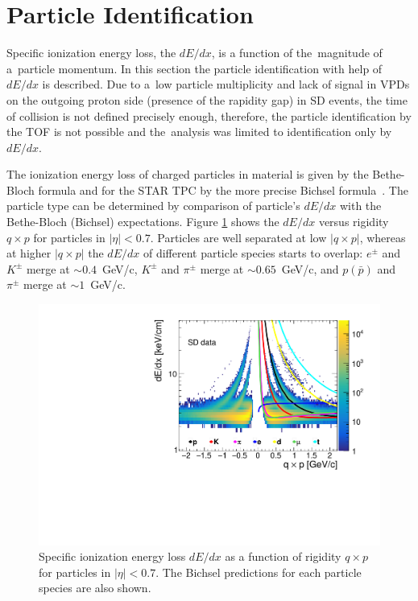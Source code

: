 \section{Particle Identification}\label{section:star_PIDdEdx}
Specific ionization energy loss, the $dE/dx$, is a function of the~magnitude of a~particle momentum.  In this section the particle identification with help of $dE/dx$  is described.
Due to a~low particle multiplicity and lack of signal in VPDs on the outgoing proton side (presence of the rapidity gap) in SD events, the time of collision is not defined precisely enough, therefore, the particle identification  by the TOF is not possible
and the~analysis was limited to identification only by $dE/dx$. 

The ionization energy loss of charged particles in material
is given by the Bethe-Bloch formula and for
the STAR \ac{TPC} by the more precise Bichsel formula~\cite{Bichsel:2006cs}.
The particle type can be determined by comparison of particle's $dE/dx$ with the Bethe-Bloch (Bichsel) expectations.
Figure \ref{fig:star_dedx} shows the  $dE/dx$ versus rigidity $q\times p$ for particles in $|\eta| < 0.7$. Particles are  well separated at low $|q\times p|$, whereas at higher $|q\times p|$ the $dE/dx$ of different particle species starts to
overlap: $e^\pm$ and $K^\pm$ merge at $\sim0.4$~GeV/c, $K^\pm$ and
$\pi^\pm$ merge at $\sim0.65$~GeV/c, and $p(\bar{p})$ and $\pi^\pm$ merge
at $\sim1$~GeV/c. 
\begin{figure}[b!]
	\centering
	\includegraphics[width=0.65\linewidth, page=1]{chapters/chrgSTAR/img/dEdx/SDT_dEdx.pdf}
	\caption[Specific ionization
	energy loss $dE/dx$ as a function of rigidity $q\times p$ for particles
	in $|\eta| < 0.7$]{Specific ionization
		energy loss $dE/dx$ as a function of rigidity $q\times p$ for particles
		in $|\eta| < 0.7$. The Bichsel predictions for each particle species are also shown.}
	\label{fig:star_dedx}
\end{figure} 
